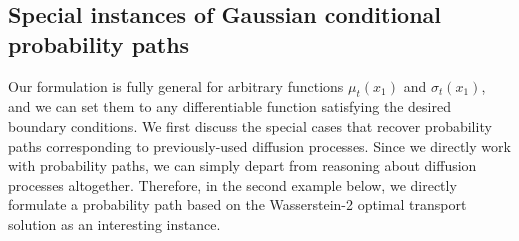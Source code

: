 \documentclass{article}
\begin{document}

\subsection{Special instances of Gaussian conditional probability paths}\label{ss:instances}

Our formulation is fully general for arbitrary functions $\mu_t(x_1)$ and $\sigma_t(x_1)$, and we can set them to any differentiable function satisfying the desired boundary conditions. 
We first discuss the special cases that recover probability paths corresponding to previously-used diffusion processes. 
Since we directly work with probability paths, we can simply depart from reasoning about diffusion processes altogether. Therefore, in the second example below, we directly formulate a probability path based on the Wasserstein-2 optimal transport solution as an interesting instance.
\end{document}

